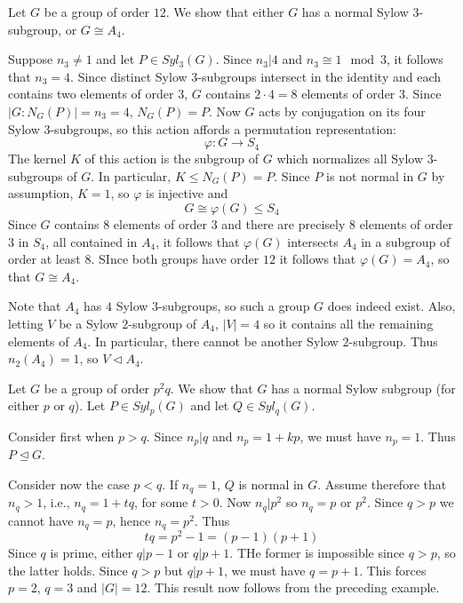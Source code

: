\documentclass[12pt, a4paper, oneside, openright, titlepage]{book}
\begin{document}
\begin{eg}
    Let $G$ be a group of order $12$. We show that either $G$ has a normal Sylow $3$-subgroup, or $G \cong A_4$.

    Suppose $n_3 \neq 1$ and let $P \in Syl_3(G)$. Since $n_3\vert 4$ and $n_3 \cong 1 \mod 3$, it follows that $n_3 = 4$. Since distinct Sylow $3$-subgroups intersect in the identity and each contains two elements of order $3$, $G$ contains $2\cdot 4 = 8$ elements of order $3$. Since $|G:N_G(P)| = n_3 = 4$, $N_G(P) = P$. Now $G$ acts by conjugation on its four Sylow $3$-subgroups, so this action affords a permutation representation: \begin{equation*}
        \varphi:G\rightarrow S_4
    \end{equation*}
    The kernel $K$ of this action is the subgroup of $G$ which normalizes all Sylow $3$-subgroups of $G$. In particular, $K \leq N_G(P) = P$. Since $P$ is not normal in $G$ by assumption, $K = 1$, so $\varphi$ is injective and \begin{equation*}
        G \cong \varphi(G) \leq S_4
    \end{equation*}
    Since $G$ contains $8$ elements of order $3$ and there are precisely $8$ elements of order $3$ in $S_4$, all contained in $A_4$, it follows that $\varphi(G)$ intersects $A_4$ in a subgroup of order at least $8$. SInce both groups have order $12$ it follows that $\varphi(G) = A_4$, so that $G\cong A_4$.

    Note that $A_4$ has $4$ Sylow $3$-subgroups, so such a group $G$ does indeed exist. Also, letting $V$ be a Sylow $2$-subgroup of $A_4$, $|V| =4$ so it contains all the remaining elements of $A_4$. In particular, there cannot be another Sylow $2$-subgroup. Thus $n_2(A_4) = 1$, so $V\triangleleft A_4$.
\end{eg}

\begin{eg}
    Let $G$ be a group of order $p^2q$. We show that $G$ has a normal Sylow subgroup (for either $p$ or $q$). Let $P \in Syl_p(G)$ and let $Q \in Syl_q(G)$. 

    Consider first when $p > q$. Since $n_p\vert q$ and $n_p = 1+kp$, we must have $n_p = 1$. Thus $P \trianglelefteq G$.

    Consider now the case $p < q$. If $n_q = 1$, $Q$ is normal in $G$. Assume therefore that $n_q > 1$, i.e., $n_q = 1+tq$, for some $t > 0$. Now $n_q\vert p^2$ so $n_q = p$ or $p^2$. Since $q > p$ we cannot have $n_q = p$, hence $n_q = p^2$. Thus \begin{equation*}
        tq = p^2-1 = (p-1)(p+1)
    \end{equation*}
    Since $q$ is prime, either $q\vert p - 1$ or $q \vert p +1$. THe former is impossible since $q > p$, so the latter holds. Since $q > p$ but $q\vert p+1$, we must  have $q = p+1$. This forces $p = 2$, $q = 3$ and $|G| = 12$. This result now follows from the preceding example.
\end{eg}
\end{document}
